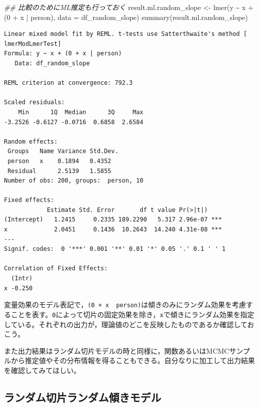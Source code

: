 \documentclass[
  a4paper,
]{ltjsbook}
\newenvironment{Shaded}{\begin{snugshade}}{\end{snugshade}}
\newcommand{\AttributeTok}[1]{\textcolor[rgb]{0.40,0.45,0.13}{#1}}
\newcommand{\DecValTok}[1]{\textcolor[rgb]{0.68,0.00,0.00}{#1}}
\newcommand{\DocumentationTok}[1]{\textcolor[rgb]{0.37,0.37,0.37}{\textit{#1}}}
\newcommand{\FunctionTok}[1]{\textcolor[rgb]{0.28,0.35,0.67}{#1}}
\newcommand{\NormalTok}[1]{\textcolor[rgb]{0.00,0.23,0.31}{#1}}
\newcommand{\OtherTok}[1]{\textcolor[rgb]{0.00,0.23,0.31}{#1}}
\newcommand{\SpecialCharTok}[1]{\textcolor[rgb]{0.37,0.37,0.37}{#1}}
\begin{document}
\begin{Shaded}
\begin{Highlighting}[]
\DocumentationTok{\#\# 比較のためにML推定も行っておく}
\NormalTok{result.ml.random\_slope }\OtherTok{\textless{}{-}} \FunctionTok{lmer}\NormalTok{(y }\SpecialCharTok{\textasciitilde{}}\NormalTok{ x }\SpecialCharTok{+}\NormalTok{ (}\DecValTok{0} \SpecialCharTok{+}\NormalTok{ x }\SpecialCharTok{|}\NormalTok{ person), }\AttributeTok{data =}\NormalTok{ df\_random\_slope)}
\FunctionTok{summary}\NormalTok{(result.ml.random\_slope)}
\end{Highlighting}
\end{Shaded}

\begin{verbatim}
Linear mixed model fit by REML. t-tests use Satterthwaite's method [
lmerModLmerTest]
Formula: y ~ x + (0 + x | person)
   Data: df_random_slope

REML criterion at convergence: 792.3

Scaled residuals: 
    Min      1Q  Median      3Q     Max 
-3.2526 -0.6127 -0.0716  0.6858  2.6584 

Random effects:
 Groups   Name Variance Std.Dev.
 person   x    0.1894   0.4352  
 Residual      2.5139   1.5855  
Number of obs: 200, groups:  person, 10

Fixed effects:
            Estimate Std. Error       df t value Pr(>|t|)    
(Intercept)   1.2415     0.2335 189.2290   5.317 2.96e-07 ***
x             2.0451     0.1436  10.2643  14.240 4.31e-08 ***
---
Signif. codes:  0 '***' 0.001 '**' 0.01 '*' 0.05 '.' 0.1 ' ' 1

Correlation of Fixed Effects:
  (Intr)
x -0.250
\end{verbatim}

変量効果のモデル表記で，\texttt{(0\ +\ x\ \textbar{}\ person)}は傾きのみにランダム効果を考慮することを表す。\texttt{0}によって切片の固定効果を除き，\texttt{x}で傾きにランダム効果を指定している。それぞれの出力が，理論値のどこを反映したものであるか確認しておこう。

また出力結果はランダム切片モデルの時と同様に，関数あるいはMCMCサンプルから推定値やその分布情報を得ることもできる。自分なりに加工して出力結果を確認してみてほしい。

\subsection{ランダム切片ランダム傾きモデル}\label{ux30e9ux30f3ux30c0ux30e0ux5207ux7247ux30e9ux30f3ux30c0ux30e0ux50beux304dux30e2ux30c7ux30eb}
\end{document}
